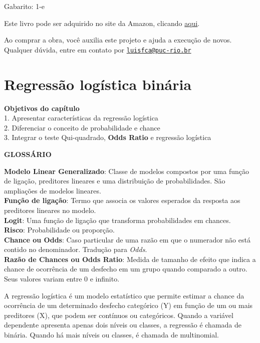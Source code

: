 \documentclass[
]{book}
\newenvironment{objectives}{
  \definecolor{shadecolor}{rgb}{0, 0, 0}  %
  \color{white}
  \begin{shaded}}
 {\end{shaded}}
\begin{document}
Gabarito: 1-e

Este livro pode ser adquirido no site da Amazon, clicando \href{https://www.amazon.com.br/gp/product/B097CP7T9M?pf_rd_r=RDZC8XYMBC1WY69T0J8K\&pf_rd_p=abb22e6b-8812-4b76-a424-5f0b098d2c90\&pd_rd_r=ceec1911-f409-4acd-ac8f-2d5bc68dac43\&pd_rd_w=wMUzJ\&pd_rd_wg=ZK85a\&ref_=pd_gw_unk}{aqui}.

Ao comprar a obra, você auxilia este projeto e ajuda a execução de novos. Qualquer dúvida, entre em contato por \href{mailto:luisfca@puc-rio.br}{\nolinkurl{luisfca@puc-rio.br}}

\hypertarget{regressuxe3o-loguxedstica-binuxe1ria}{%
\chapter{Regressão logística binária}\label{regressuxe3o-loguxedstica-binuxe1ria}}

\begin{objectives}
\textbf{Objetivos do capítulo}\\
1. Apresentar características da regressão logística\\
2. Diferenciar o conceito de probabilidade e chance\\
3. Integrar o teste Qui-quadrado, \textbf{Odds Ratio} e regressão logística

\end{objectives}

\textbf{GLOSSÁRIO}

\textbf{Modelo Linear Generalizado}: Classe de modelos compostos por uma função de ligação, preditores lineares e uma distribuição de probabilidades. São ampliações de modelos lineares.\\
\textbf{Função de ligação}: Termo que associa os valores esperados da resposta aos preditores lineares no modelo.\\
\textbf{Logit}: Uma função de ligação que transforma probabilidades em chances.\\
\textbf{Risco}: Probabilidade ou proporção.\\
\textbf{Chance ou Odds}: Caso particular de uma razão em que o numerador não está contido no denominador. Tradução para \emph{Odds}.\\
\textbf{Razão de Chances ou Odds Ratio}: Medida de tamanho de efeito que indica a chance de ocorrência de um desfecho em um grupo quando comparado a outro. Seus valores variam entre 0 e infinito.

A regressão logística é um modelo estatístico que permite estimar a chance da ocorrência de um determinado desfecho categórico (Y) em função de um ou mais preditores (X), que podem ser contínuos ou categóricos. Quando a variável dependente apresenta apenas dois níveis ou classes, a regressão é chamada de binária. Quando há mais níveis ou classes, é chamada de multinomial.
\end{document}
